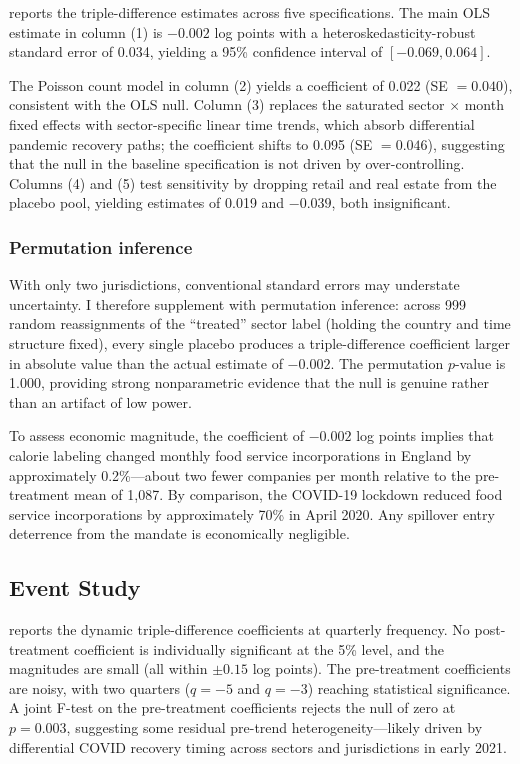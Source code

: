 \documentclass[12pt]{article}
\begin{document}


 reports the triple-difference estimates across five specifications. The main OLS estimate in column (1) is $-0.002$ log points with a heteroskedasticity-robust standard error of 0.034, yielding a 95\% confidence interval of $[-0.069, 0.064]$.

The Poisson count model in column (2) yields a coefficient of 0.022 (SE $= 0.040$), consistent with the OLS null. Column (3) replaces the saturated sector $\times$ month fixed effects with sector-specific linear time trends, which absorb differential pandemic recovery paths; the coefficient shifts to 0.095 (SE $= 0.046$), suggesting that the null in the baseline specification is not driven by over-controlling. Columns (4) and (5) test sensitivity by dropping retail and real estate from the placebo pool, yielding estimates of 0.019 and $-0.039$, both insignificant.

\subsubsection*{Permutation inference} With only two jurisdictions, conventional standard errors may understate uncertainty. I therefore supplement with permutation inference: across 999 random reassignments of the ``treated'' sector label (holding the country and time structure fixed), every single placebo produces a triple-difference coefficient larger in absolute value than the actual estimate of $-0.002$. The permutation $p$-value is 1.000, providing strong nonparametric evidence that the null is genuine rather than an artifact of low power.

To assess economic magnitude, the coefficient of $-0.002$ log points implies that calorie labeling changed monthly food service incorporations in England by approximately 0.2\%---about two fewer companies per month relative to the pre-treatment mean of 1,087. By comparison, the COVID-19 lockdown reduced food service incorporations by approximately 70\% in April 2020. Any spillover entry deterrence from the mandate is economically negligible.

\subsection{Event Study}



 reports the dynamic triple-difference coefficients at quarterly frequency. No post-treatment coefficient is individually significant at the 5\% level, and the magnitudes are small (all within $\pm 0.15$ log points). The pre-treatment coefficients are noisy, with two quarters ($q = -5$ and $q = -3$) reaching statistical significance. A joint F-test on the pre-treatment coefficients rejects the null of zero at $p = 0.003$, suggesting some residual pre-trend heterogeneity---likely driven by differential COVID recovery timing across sectors and jurisdictions in early 2021.
\end{document}
